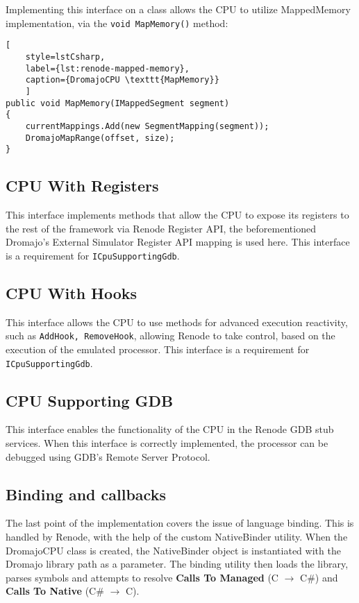 \noindent
Implementing this interface on a class allows the CPU to utilize MappedMemory implementation, via the \texttt{void MapMemory()} method:

\begin{lstlisting}[
    style=lstCsharp,
    label={lst:renode-mapped-memory},
    caption={DromajoCPU \texttt{MapMemory}}
    ]
public void MapMemory(IMappedSegment segment)
{
    currentMappings.Add(new SegmentMapping(segment));
    DromajoMapRange(offset, size);
}
\end{lstlisting}

\subsection*{CPU With Registers}
This interface implements methods that allow the CPU to expose its registers to the rest of the framework via Renode Register API, the beforementioned Dromajo's External
Simulator Register API mapping is used here. This interface is a requirement for \texttt{ICpuSupportingGdb}.

\subsection*{CPU With Hooks}
This interface allows the CPU to use methods for advanced execution reactivity, such as \texttt{AddHook, RemoveHook},
allowing Renode to take control, based on the execution of the emulated processor.
This interface is a requirement for \texttt{ICpuSupportingGdb}.

\pagebreak

\subsection*{CPU Supporting GDB}

This interface enables the functionality of the CPU in the Renode GDB stub services. When this interface is correctly
implemented, the processor can be debugged using GDB's Remote Server Protocol.

\subsection{Binding and callbacks}

The last point of the implementation covers the issue of language binding. This is handled by Renode, with the help
of the custom NativeBinder utility. When the DromajoCPU class is created, the NativeBinder object is instantiated with
the Dromajo library path as a parameter. The binding utility then loads the library, parses symbols and attempts to resolve
\textbf{Calls To Managed} (C $\rightarrow$ C\#) and \textbf{Calls To Native} (C\# $\rightarrow$ C).

